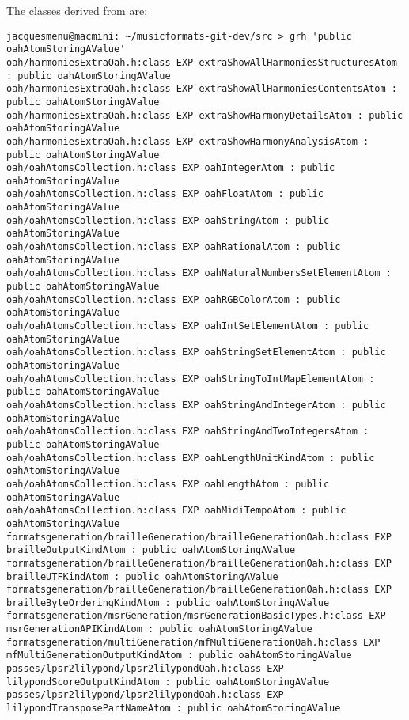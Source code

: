 The classes derived from  are:
\begin{lstlisting}[language=Terminal]
jacquesmenu@macmini: ~/musicformats-git-dev/src > grh 'public oahAtomStoringAValue'
oah/harmoniesExtraOah.h:class EXP extraShowAllHarmoniesStructuresAtom : public oahAtomStoringAValue
oah/harmoniesExtraOah.h:class EXP extraShowAllHarmoniesContentsAtom : public oahAtomStoringAValue
oah/harmoniesExtraOah.h:class EXP extraShowHarmonyDetailsAtom : public oahAtomStoringAValue
oah/harmoniesExtraOah.h:class EXP extraShowHarmonyAnalysisAtom : public oahAtomStoringAValue
oah/oahAtomsCollection.h:class EXP oahIntegerAtom : public oahAtomStoringAValue
oah/oahAtomsCollection.h:class EXP oahFloatAtom : public oahAtomStoringAValue
oah/oahAtomsCollection.h:class EXP oahStringAtom : public oahAtomStoringAValue
oah/oahAtomsCollection.h:class EXP oahRationalAtom : public oahAtomStoringAValue
oah/oahAtomsCollection.h:class EXP oahNaturalNumbersSetElementAtom : public oahAtomStoringAValue
oah/oahAtomsCollection.h:class EXP oahRGBColorAtom : public oahAtomStoringAValue
oah/oahAtomsCollection.h:class EXP oahIntSetElementAtom : public oahAtomStoringAValue
oah/oahAtomsCollection.h:class EXP oahStringSetElementAtom : public oahAtomStoringAValue
oah/oahAtomsCollection.h:class EXP oahStringToIntMapElementAtom : public oahAtomStoringAValue
oah/oahAtomsCollection.h:class EXP oahStringAndIntegerAtom : public oahAtomStoringAValue
oah/oahAtomsCollection.h:class EXP oahStringAndTwoIntegersAtom : public oahAtomStoringAValue
oah/oahAtomsCollection.h:class EXP oahLengthUnitKindAtom : public oahAtomStoringAValue
oah/oahAtomsCollection.h:class EXP oahLengthAtom : public oahAtomStoringAValue
oah/oahAtomsCollection.h:class EXP oahMidiTempoAtom : public oahAtomStoringAValue
formatsgeneration/brailleGeneration/brailleGenerationOah.h:class EXP brailleOutputKindAtom : public oahAtomStoringAValue
formatsgeneration/brailleGeneration/brailleGenerationOah.h:class EXP brailleUTFKindAtom : public oahAtomStoringAValue
formatsgeneration/brailleGeneration/brailleGenerationOah.h:class EXP brailleByteOrderingKindAtom : public oahAtomStoringAValue
formatsgeneration/msrGeneration/msrGenerationBasicTypes.h:class EXP msrGenerationAPIKindAtom : public oahAtomStoringAValue
formatsgeneration/multiGeneration/mfMultiGenerationOah.h:class EXP mfMultiGenerationOutputKindAtom : public oahAtomStoringAValue
passes/lpsr2lilypond/lpsr2lilypondOah.h:class EXP lilypondScoreOutputKindAtom : public oahAtomStoringAValue
passes/lpsr2lilypond/lpsr2lilypondOah.h:class EXP lilypondTransposePartNameAtom : public oahAtomStoringAValue

\end{lstlisting}
